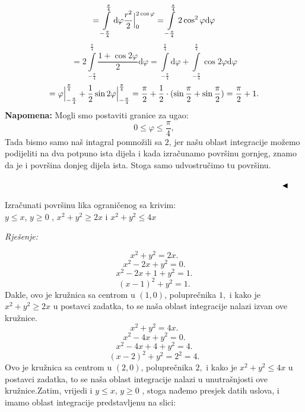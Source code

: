 \documentclass[a4paper,11pt]{article}
\begin{document}
$$= \int\limits_{-\frac{\pi}{4}}^{\frac{\pi}{4}} \mathrm d \varphi  \frac{r^{2}}{2} \Big{|}_{0}^{2\cos{\varphi}} = \int\limits_{-\frac{\pi}{4}}^{\frac{\pi}{4}} 2\cos^{2}{\varphi}  \mathrm d \varphi$$
$$   = 2\int\limits_{-\frac{\pi}{4}}^{\frac{\pi}{4}}\frac{ 1 +\cos{2\varphi}}{2}  \mathrm d \varphi  =  \int\limits_{-\frac{\pi}{4}}^{\frac{\pi}{4}} \mathrm d \varphi  + \int\limits_{-\frac{\pi}{4}}^{\frac{\pi}{4}}\cos{2\varphi} \mathrm d \varphi$$
$$= \varphi\Big{|}_{-\frac{\pi}{4}}^{\frac{\pi}{4}} + \frac{1}{2}\sin{2\varphi}\Big{|}_{-\frac{\pi}{4}}^{\frac{\pi}{4}} = \frac{\pi}{2} +\frac{1}{2}\cdot(\sin{\frac{\pi}{2}} + \sin{\frac{\pi}{2}})  = \frac{\pi}{2} + 1. $$
 \textbf{Napomena:} Mogli smo postaviti granice za ugao: 
$$ 0\leq \varphi \leq \frac{\pi}{4} , $$
Tada bismo samo naš intagral pomnožili sa $2$, jer našu oblast integracije možemo podijeliti na   dva potpuno ista dijela  i kada izračunamo površinu gornjeg, znamo da je i površina donjeg dijela ista. Stoga samo udvostručimo tu površinu.

 $\hskip  12 cm  \blacktriangleleft$ \\
  \begin{tcolorbox}[colback=brown!35!white,colframe=white!75!white,title= $$\bullet \bullet \bullet$$]
         \begin{zadatak}
Izračunati površinu lika ograničenog sa krivim:\\ $y\leq x$, $y\geq 0$ , $x^{2} + y^{2} \geq 2x$  i $x^{2} + y^{2} \leq 4x$

\end{zadatak}
\end{tcolorbox}
\emph{Rješenje: }

$$x^{2} + y^{2} = 2x.$$ 
$$x^{2} - 2x + y^{2} = 0.$$ 
$$x^{2} - 2x +1 + y^{2} = 1.$$
$$(x-1)^{2}  + y^{2} = 1.$$
Dakle, ovo je kružnica sa centrom u $(1,0)$, poluprečnika $1,$ i kako je $x^{2} + y^{2} \geq 2x$ u postavci zadatka, to se naša oblast integracije nalazi izvan ove kružnice.
$$x^{2} + y^{2} = 4x.$$ 
$$x^{2} - 4x + y^{2} = 0.$$ 
$$x^{2} - 4x +4 + y^{2} = 4.$$
$$(x-2)^{2}  + y^{2} = 2^{2} = 4.$$
Ovo je kružnica sa centrom u $(2,0)$, poluprečnika $2,$ i kako je $x^{2} + y^{2} \leq 4x$ u postavci zadatka, to se naša oblast integracije nalazi u unutrašnjosti ove kružnice.Zatim, vrijedi  i $y\leq x$, $y\geq 0$ , stoga
nađemo presjek datih uslova, i imamo oblast integracije predstavljenu na slici:

\begin{center}
\end{center}
\end{document}
